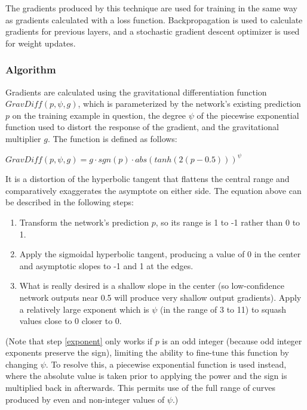 \documentclass[10pt]{article}
\begin{document}
The gradients produced by this technique are used for training in the same way as gradients calculated with a loss function. Backpropagation is used to calculate gradients for previous layers, and a stochastic gradient descent optimizer is used for weight updates.

\subsubsection{Algorithm}

Gradients are calculated using the gravitational differentiation function $GravDiff(p, \psi, g)$, which is parameterized by the network's existing prediction $p$ on the training example in question, the degree $\psi$ of the piecewise exponential function used to distort the response of the gradient, and the gravitational multiplier $g$. The function is defined as follows:

$GravDiff(p, \psi, g) = g \cdot sgn(p) \cdot abs(tanh(2(p - 0.5))) ^ \psi$

It is a distortion of the hyperbolic tangent that flattens the central range and comparatively exaggerates the asymptote on either side. The equation above can be described in the following steps:

\begin{enumerate}
    \item Transform the network's prediction $p$, so its range is 1 to -1 rather than 0 to 1.
    \item Apply the sigmoidal hyperbolic tangent, producing a value of 0 in the center and asymptotic slopes to -1 and 1 at the edges.
    \item \label{exponent} What is really desired is a shallow slope in the center (so low-confidence network outputs near 0.5 will produce very shallow output gradients). Apply a relatively large exponent which is $\psi$ (in the range of 3 to 11) to squash values close to 0 closer to 0.
\end{enumerate}

(Note that step \ref{exponent} only works if $p$ is an odd integer (because odd integer exponents preserve the sign), limiting the ability to fine-tune this function by changing $\psi$. To resolve this, a piecewise exponential function is used instead, where the absolute value is taken prior to applying the power and the sign is multiplied back in afterwards. This permits use of the full range of curves produced by even and non-integer values of $\psi$.)
\end{document}
